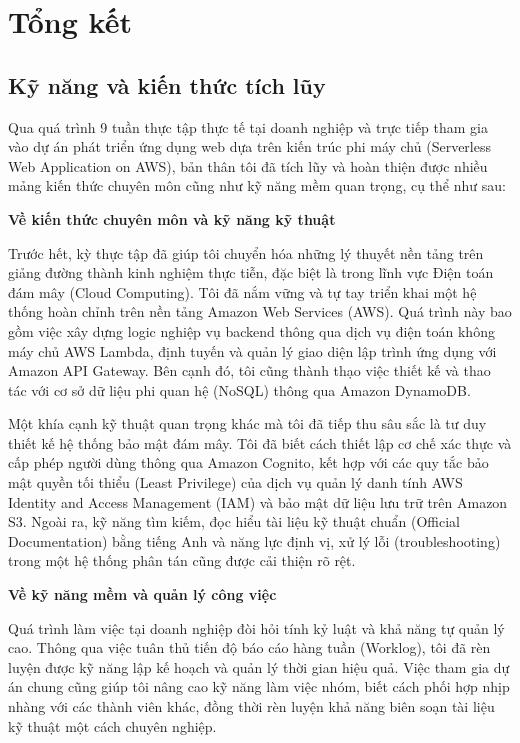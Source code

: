 \newpage
\section{Tổng kết}

\subsection{Kỹ năng và kiến thức tích lũy}

Qua quá trình 9 tuần thực tập thực tế tại doanh nghiệp và trực tiếp tham gia vào dự án phát triển ứng dụng web dựa trên kiến trúc phi máy chủ (Serverless Web Application on AWS), bản thân tôi đã tích lũy và hoàn thiện được nhiều mảng kiến thức chuyên môn cũng như kỹ năng mềm quan trọng, cụ thể như sau:

\vspace{0.2cm}
\noindent\textbf{Về kiến thức chuyên môn và kỹ năng kỹ thuật}

Trước hết, kỳ thực tập đã giúp tôi chuyển hóa những lý thuyết nền tảng trên giảng đường thành kinh nghiệm thực tiễn, đặc biệt là trong lĩnh vực Điện toán đám mây (Cloud Computing). Tôi đã nắm vững và tự tay triển khai một hệ thống hoàn chỉnh trên nền tảng Amazon Web Services (AWS). Quá trình này bao gồm việc xây dựng logic nghiệp vụ backend thông qua dịch vụ điện toán không máy chủ AWS Lambda, định tuyến và quản lý giao diện lập trình ứng dụng với Amazon API Gateway. Bên cạnh đó, tôi cũng thành thạo việc thiết kế và thao tác với cơ sở dữ liệu phi quan hệ (NoSQL) thông qua Amazon DynamoDB.

Một khía cạnh kỹ thuật quan trọng khác mà tôi đã tiếp thu sâu sắc là tư duy thiết kế hệ thống bảo mật đám mây. Tôi đã biết cách thiết lập cơ chế xác thực và cấp phép người dùng thông qua Amazon Cognito, kết hợp với các quy tắc bảo mật quyền tối thiểu (Least Privilege) của dịch vụ quản lý danh tính AWS Identity and Access Management (IAM) và bảo mật dữ liệu lưu trữ trên Amazon S3. Ngoài ra, kỹ năng tìm kiếm, đọc hiểu tài liệu kỹ thuật chuẩn (Official Documentation) bằng tiếng Anh và năng lực định vị, xử lý lỗi (troubleshooting) trong một hệ thống phân tán cũng được cải thiện rõ rệt.

\vspace{0.2cm}
\noindent\textbf{Về kỹ năng mềm và quản lý công việc}

Quá trình làm việc tại doanh nghiệp đòi hỏi tính kỷ luật và khả năng tự quản lý cao. Thông qua việc tuân thủ tiến độ báo cáo hàng tuần (Worklog), tôi đã rèn luyện được kỹ năng lập kế hoạch và quản lý thời gian hiệu quả. Việc tham gia dự án chung cũng giúp tôi nâng cao kỹ năng làm việc nhóm, biết cách phối hợp nhịp nhàng với các thành viên khác, đồng thời rèn luyện khả năng biên soạn tài liệu kỹ thuật một cách chuyên nghiệp.

